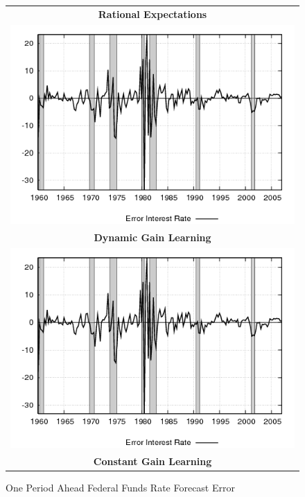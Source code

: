 \begin{figure}[ht]
\caption{One Period Ahead Federal Funds Rate Forecast Error}\label{fg3:fedfundserr}
\begin{center}
\begin{tabular}{c}
\textbf{Rational Expectations} \\  
\includegraphics[scale=0.5]{results_re/fedfunds_err.png} \\
\textbf{Dynamic Gain Learning} \\
\includegraphics[scale=0.5]{results_dg8_wlsinit/fedfunds_err.png} \\
\textbf{Constant Gain Learning} \\

\end{tabular}
\end{center}
\end{figure}
